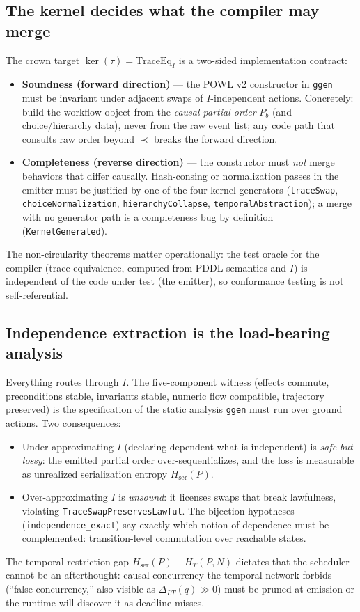 \documentclass[11pt]{article}
\newcommand{\tmap}{\tau}                       %
\newcommand{\Hser}{H_{\mathrm{ser}}}
\theoremstyle{plain}
\theoremstyle{definition}
\begin{document}
\subsection{The kernel decides what the compiler may merge}
The crown target $\ker(\tmap) = \mathrm{TraceEq}_I$ is a two-sided
implementation contract:
\begin{itemize}[nosep]
  \item \textbf{Soundness (forward direction)} --- the POWL v2 constructor in
  \texttt{ggen} must be invariant under adjacent swaps of $I$-independent
  actions. Concretely: build the workflow object from the \emph{causal
  partial order} $P_b$ (and choice/hierarchy data), never from the raw event
  list; any code path that consults raw order beyond $\prec$ breaks the
  forward direction.
  \item \textbf{Completeness (reverse direction)} --- the constructor must
  \emph{not} merge behaviors that differ causally. Hash-consing or
  normalization passes in the emitter must be justified by one of the four
  kernel generators (\texttt{traceSwap}, \texttt{choiceNormalization},
  \texttt{hierarchyCollapse}, \texttt{temporalAbstraction}); a merge with no
  generator path is a completeness bug by definition
  (\texttt{KernelGenerated}).
\end{itemize}
The non-circularity theorems matter operationally: the test oracle for the
compiler (trace equivalence, computed from PDDL semantics and $I$) is
independent of the code under test (the emitter), so conformance testing is
not self-referential.

\subsection{Independence extraction is the load-bearing analysis}
Everything routes through $I$. The five-component witness
(effects commute, preconditions stable, invariants stable, numeric flow
compatible, trajectory preserved) is the specification of the static
analysis \texttt{ggen} must run over ground actions. Two consequences:
\begin{itemize}[nosep]
  \item Under-approximating $I$ (declaring dependent what is independent) is
  \emph{safe but lossy}: the emitted partial order over-sequentializes, and
  the loss is measurable as unrealized serialization entropy
  $\Hser(P)$.
  \item Over-approximating $I$ is \emph{unsound}: it licenses swaps that
  break lawfulness, violating \texttt{TraceSwapPreservesLawful}. The
  bijection hypotheses (\texttt{independence\_exact}) say exactly which
  notion of dependence must be complemented: transition-level commutation
  over reachable states.
\end{itemize}
The temporal restriction gap $\Hser(P) - H_T(P,N)$ dictates that the
scheduler cannot be an afterthought: causal concurrency the temporal network
forbids (``false concurrency,'' also visible as $\Delta_{LT}(q) \gg 0$) must
be pruned at emission or the runtime will discover it as deadline misses.
\end{document}
